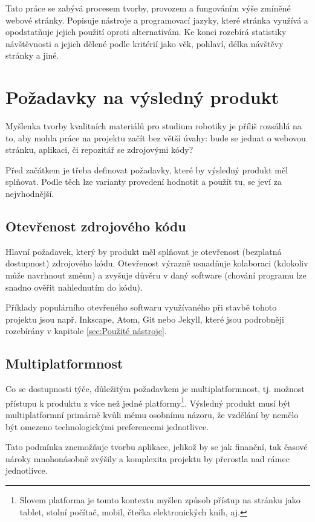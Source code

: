 \documentclass[a4paper, 12pt]{article}
\begin{document}
  Tato práce se zabývá procesem tvorby, provozem a fungováním výše zmíněné webové stránky. Popisuje nástroje a programovací jazyky, které stránka využívá a opodstatňuje jejich použití oproti alternativám. Ke konci rozebírá statistiky návštěvnosti a jejich dělené podle kritérií jako věk, pohlaví, délka návštěvy stránky a jiné.

  \newpage

  \section{Požadavky na výsledný produkt}
  Myšlenka tvorby kvalitních materiálů pro studium robotiky je příliš rozsáhlá na to, aby mohla práce na projektu začít bez větší úvahy: bude se jednat o webovou stránku, aplikaci, či repozitář se zdrojovými kódy?

  Před začátkem je třeba definovat požadavky, které by výsledný produkt měl splňovat. Podle těch lze varianty provedení hodnotit a použít tu, se jeví za nejvhodnější.


  \subsection{Otevřenost zdrojového kódu}
  Hlavní požadavek, který by produkt měl splňovat je otevřenost (bezplatná dostupnost) zdrojového kódu. Otevřenost výrazně usnadňuje kolaboraci (kdokoliv může navrhnout změnu) a zvyšuje důvěru v daný software (chování programu lze snadno ověřit nahlednutím do kódu).

  Příklady populárního otevřeného softwaru využívaného při stavbě tohoto projektu jsou např. Inkscape\cite{inkscape-source}, Atom\cite{atom-source}, Git\cite{git-source} nebo Jekyll\cite{jekyll-source}, které jsou podrobněji rozebírány v kapitole \ref{sec:Použité nástroje}.


  \subsection{Multiplatformnost}
  Co se dostupnosti týče, důležitým požadavkem je multiplatformnost, tj. možnost přístupu k produktu z více než jedné platformy\footnote{Slovem platforma je tomto kontextu myšlen způsob přístup na stránku jako tablet, stolní počítač, mobil, čtečka elektronických knih, aj.}. Výsledný produkt musí být multiplatformní primárně kvůli mému osobnímu názoru, že vzdělání by nemělo být omezeno technologickými preferencemi jednotlivce.

  Tato podmínka znemožňuje tvorbu aplikace, jelikož by se jak finanční\cite{apple-store-membership,android-store-membership,wedos-hosting}, tak časové nároky mnohonásobně zvýšily a komplexita projektu by přerostla nad rámec jednotlivce.
\end{document}
